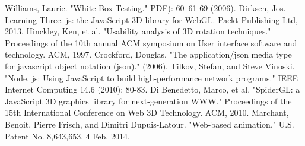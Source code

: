 \documentclass[11pt]{article}
\begin{document}
\begin{thebibliography}{}
\bibitem[17]{}Williams, Laurie. "White-Box Testing." PDF): 60–61 69 (2006).
\bibitem[18]{}Dirksen, Jos. Learning Three. js: the JavaScript 3D library for WebGL. Packt Publishing Ltd, 2013.
\bibitem[19]{}Hinckley, Ken, et al. "Usability analysis of 3D rotation techniques." Proceedings of the 10th annual ACM symposium on User interface software and technology. ACM, 1997.
\bibitem[20]{}Crockford, Douglas. "The application/json media type for javascript object notation (json)." (2006).
\bibitem[21]{}Tilkov, Stefan, and Steve Vinoski. "Node. js: Using JavaScript to build high-performance network programs." IEEE Internet Computing 14.6 (2010): 80-83.
\bibitem[22]{}Di Benedetto, Marco, et al. "SpiderGL: a JavaScript 3D graphics library for next-generation WWW." Proceedings of the 15th International Conference on Web 3D Technology. ACM, 2010.
\bibitem[23]{}Marchant, Benoit, Pierre Frisch, and Dimitri Dupuis-Latour. "Web-based animation." U.S. Patent No. 8,643,653. 4 Feb. 2014.

\end{thebibliography}
\end{document}
